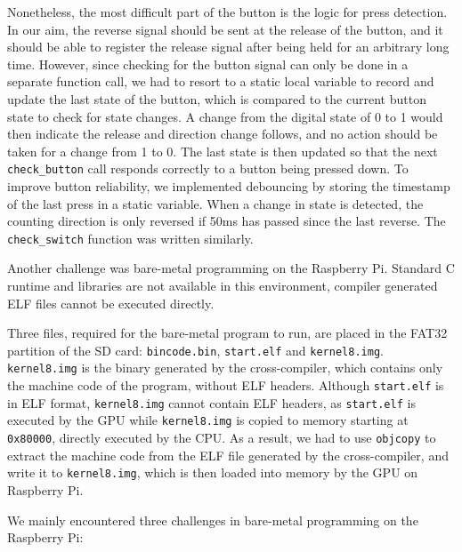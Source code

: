 \documentclass[9pt,a4paper]{article}
\begin{document}
Nonetheless, the most difficult part of the button is the logic for press detection. In our aim, the reverse signal should be sent at the release of the button, and it should be able to register the release signal after being held for an arbitrary long time.
However, since checking for the button signal can only be done in a separate function call, we had to resort to a static local variable to record and update the last state of the button, which is compared to the current button state to check for state changes.
A change from the digital state of 0 to 1 would then indicate the release and direction change follows, and no action should be taken for a change from 1 to 0.
The last state is then updated so that the next \verb|check_button| call responds correctly to a button being pressed down. To improve button reliability, we implemented debouncing by storing the timestamp of the last press in a static variable.
When a change in state is detected, the counting direction is only reversed if 50ms has passed since the last reverse.
The \verb|check_switch| function was written similarly.

Another challenge was bare-metal programming on the Raspberry Pi. Standard C runtime and libraries are not available in this environment, compiler generated ELF files cannot be executed directly.

Three files, required for the bare-metal program to run, are placed in the FAT32 partition of the SD card: \verb|bincode.bin|, \verb|start.elf| and \verb|kernel8.img|. \verb|kernel8.img| is the binary generated by the cross-compiler, which contains only the machine code of the program, without ELF headers. Although \verb|start.elf| is in ELF format, \verb|kernel8.img| cannot contain ELF headers, as \verb|start.elf| is executed by the GPU while \verb|kernel8.img| is copied to memory starting at \verb|0x80000|, directly executed by the CPU.  As a result, we had to use \verb|objcopy| to extract the machine code from the ELF file generated by the cross-compiler, and write it to \verb|kernel8.img|, which is then loaded into memory by the GPU on Raspberry Pi.

We mainly encountered three challenges in bare-metal programming on the Raspberry Pi:
\end{document}
